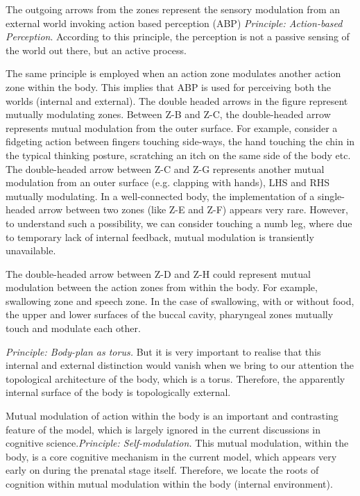 The outgoing arrows from the zones represent the sensory modulation from an external world invoking action based perception (ABP) \cite{noe_action_2004}\emph{Principle: Action-based Perception}. According to this principle, the perception is not a passive sensing of the world out there, but an active process.

The same principle is employed when an action zone modulates another action zone within the body. This implies that ABP is used for perceiving both the worlds (internal and external). The double headed arrows in the figure represent mutually modulating zones. Between Z-B and Z-C, the double-headed arrow represents mutual modulation from the outer surface. For example, consider a fidgeting action between fingers touching side-ways, the hand touching the chin in the typical thinking posture, scratching an itch on the same side of the body etc. The double-headed arrow between Z-C and Z-G represents another mutual modulation from an outer surface (e.g. clapping with hands), LHS and RHS mutually modulating.
In a well-connected body, the implementation of a single-headed arrow between two zones (like Z-E and Z-F) appears very rare. However, to understand such a possibility, we can consider touching a numb leg, where due to temporary lack of internal feedback, mutual modulation is transiently unavailable.

The double-headed arrow between Z-D and Z-H could represent mutual modulation between the action zones from within the body. For example, swallowing zone and speech zone. In the case of swallowing, with or without food, the upper and lower surfaces of the buccal cavity, pharyngeal zones mutually touch and modulate each other.

\emph{Principle: Body-plan as torus.} But it is very important to realise that this internal and external distinction would vanish when we bring to our attention the topological architecture of the body, which is a torus. Therefore, the apparently internal surface of the body is topologically external. 

Mutual modulation of action within the body is an important and contrasting feature of the model, which is largely ignored in the current discussions in cognitive science.\label{contrast-internal-ABP}\emph{Principle: Self-modulation.} This mutual modulation, within the body, is a core cognitive mechanism in the current model, which appears very early on during the prenatal stage itself. Therefore, we locate the roots of cognition within mutual modulation within the body (internal environment). 

